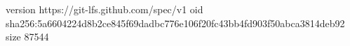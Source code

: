version https://git-lfs.github.com/spec/v1
oid sha256:5a6604224d8b2ce845f69dadbc776e106f20fc43bb4fd903f50abca3814deb92
size 87544
